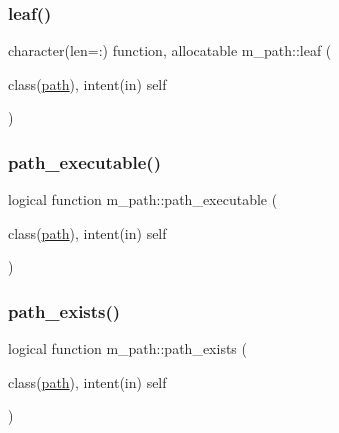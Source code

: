 \mbox{\label{namespacem__path_a162b776783f42fc4fe2d3a1b951a1172}} 
\subsubsection{\texorpdfstring{leaf()}{leaf()}}
{\footnotesize\ttfamily character(len=\+:) function, allocatable m\+\_\+path\+::leaf (\begin{DoxyParamCaption}\item[{class(\mbox{\hyperlink{structm__path_1_1path}{path}}), intent(in)}]{self }\end{DoxyParamCaption})}

\mbox{\label{namespacem__path_abcf12fcdc2f3d90663783ff774b25261}} 
\subsubsection{\texorpdfstring{path\+\_\+executable()}{path\_executable()}}
{\footnotesize\ttfamily logical function m\+\_\+path\+::path\+\_\+executable (\begin{DoxyParamCaption}\item[{class(\mbox{\hyperlink{structm__path_1_1path}{path}}), intent(in)}]{self }\end{DoxyParamCaption})\hspace{0.3cm}{\ttfamily [private]}}

\mbox{\label{namespacem__path_a1d3741add7dd7d180b71295c4a1761c6}} 
\subsubsection{\texorpdfstring{path\+\_\+exists()}{path\_exists()}}
{\footnotesize\ttfamily logical function m\+\_\+path\+::path\+\_\+exists (\begin{DoxyParamCaption}\item[{class(\mbox{\hyperlink{structm__path_1_1path}{path}}), intent(in)}]{self }\end{DoxyParamCaption})\hspace{0.3cm}{\ttfamily [private]}}

